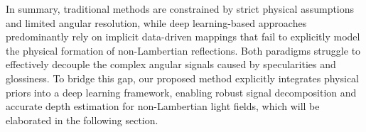In summary, traditional methods are constrained by strict physical assumptions and limited angular resolution, while deep learning-based approaches predominantly rely on implicit data-driven mappings that fail to explicitly model the physical formation of non-Lambertian reflections. Both paradigms struggle to effectively decouple the complex angular signals caused by specularities and glossiness. To bridge this gap, our proposed method explicitly integrates physical priors into a deep learning framework, enabling robust signal decomposition and accurate depth estimation for non-Lambertian light fields, which will be elaborated in the following section.